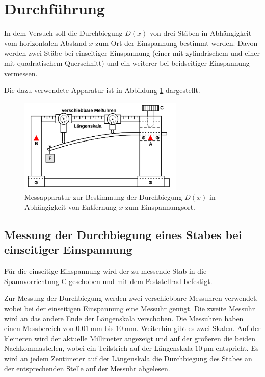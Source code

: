 \section{Durchführung}
\label{sec:Durchführung}

In dem Versuch soll die Durchbiegung $D(x)$ von drei Stäben in Abhängigkeit vom horizontalen
Abstand $x$ zum Ort der Einspannung bestimmt werden.
Davon werden zwei Stäbe bei einseitiger Einspannung (einer mit zylindrischem und einer mit
quadratischem Querschnitt) und ein weiterer bei beidseitiger Einspannung vermessen.

Die dazu verwendete Apparatur ist in Abbildung \ref{fig:aufbauamk} dargestellt.
\begin{figure}
	\centering
	\includegraphics[width=0.7\textwidth]{Bilder/Aufbau_Messung.png}
	\caption{Messapparatur zur Bestimmung der Durchbiegung $D(x)$ in Abhängigkeit von
		Entfernung $x$ zum Einspannungsort. \cite{Anleitung}}
	\label{fig:aufbauamk}
\end{figure}
\subsection{Messung der Durchbiegung eines Stabes bei einseitiger Einspannung}
Für die einseitige Einspannung wird der zu messende Stab in die Spannvorrichtung C geschoben und mit dem Feststellrad befestigt.

Zur Messung der Durchbiegung werden zwei verschiebbare Messuhren verwendet, wobei bei der
einseitigen Einspannung eine Messuhr genügt. Die zweite Messuhr wird an das andere Ende der
Längenskala verschoben.
Die Messuhren haben einen Messbereich von $\SI{0,01}{\milli\meter}$ bis $\SI{10}{\milli\meter}$.
Weiterhin gibt es zwei Skalen. Auf der kleineren wird der aktuelle Millimeter angezeigt und
auf der größeren die beiden Nachkommastellen, wobei ein Teilstrich auf der Längenskala
$\SI{10}{\micro\meter}$ entspricht.
Es wird an jedem Zentimeter auf der Längenskala die Durchbiegung des Stabes an der
entsprechenden Stelle auf der Messuhr abgelesen.

